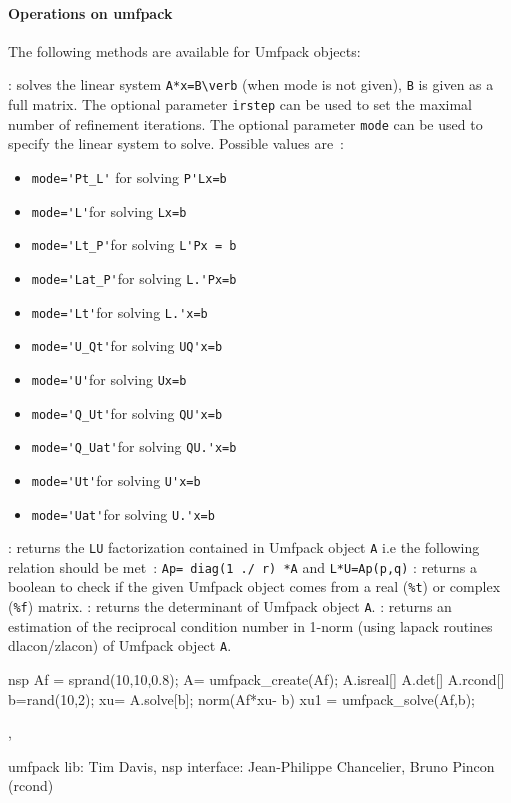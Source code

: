 \paragraph{Operations on umfpack}
The following methods are available for Umfpack objects:
\begin{varlist}
  : solves the linear system \verb+A*x=B\verb+ (when mode is not given), \verb+B+ is given as a full 
   matrix. The optional parameter \verb+irstep+ can be used to set the maximal number of refinement iterations.
   The optional parameter \verb+mode+ can be used to specify the linear system to solve. Possible values are~:
     \begin{itemize} 
        \item \verb+mode='Pt_L'+ for solving \verb+P'Lx=b+
        \item \verb+mode='L'+for solving \verb+Lx=b+
        \item \verb+mode='Lt_P'+for solving \verb+L'Px = b+
        \item \verb+mode='Lat_P'+for solving \verb+L.'Px=b+
        \item \verb+mode='Lt'+for solving \verb+L.'x=b+
        \item \verb+mode='U_Qt'+for solving \verb+UQ'x=b+
        \item \verb+mode='U'+for solving \verb+Ux=b+
        \item \verb+mode='Q_Ut'+for solving \verb+QU'x=b+
        \item \verb+mode='Q_Uat'+for solving \verb+QU.'x=b+
        \item \verb+mode='Ut'+for solving \verb+U'x=b+
        \item \verb+mode='Uat'+for solving \verb+U.'x=b+
     \end{itemize}
  : returns the \verb+LU+ factorization contained in Umfpack object \verb+A+ i.e the following relation should be met~: \verb+Ap= diag(1 ./ r) *A+ and 
  \verb+L*U=Ap(p,q)+ 
  : returns a boolean to check if the given Umfpack object comes from a real 
  (\verb+%t+) or complex (\verb+%f+) matrix. 
  : returns the determinant of Umfpack object \verb+A+.
  : returns an estimation of the reciprocal condition
  number in 1-norm (using lapack routines dlacon/zlacon) of Umfpack object \verb+A+.
  \end{varlist}

\begin{examples}
\begin{mintednsp}{nsp}
Af = sprand(10,10,0.8);
A= umfpack_create(Af);
A.isreal[]
A.det[] 
A.rcond[] 
b=rand(10,2); 
xu= A.solve[b]; 
norm(Af*xu- b) 
xu1 = umfpack_solve(Af,b);
\end{mintednsp}
\end{examples}

\begin{manseealso}
, 
\end{manseealso}


\begin{authors}
   umfpack lib: Tim Davis, nsp interface: Jean-Philippe Chancelier,
   Bruno Pincon (rcond)
\end{authors}

